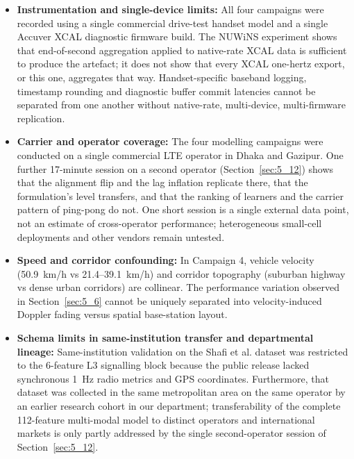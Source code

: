\begin{itemize}
    \item \textbf{Instrumentation and single-device limits:} All four campaigns were recorded using a single commercial drive-test handset model and a single Accuver XCAL diagnostic firmware build. The NUWiNS experiment shows that end-of-second aggregation applied to native-rate XCAL data is sufficient to produce the artefact; it does not show that every XCAL one-hertz export, or this one, aggregates that way. Handset-specific baseband logging, timestamp rounding and diagnostic buffer commit latencies cannot be separated from one another without native-rate, multi-device, multi-firmware replication.
    \item \textbf{Carrier and operator coverage:} The four modelling campaigns were conducted on a single commercial LTE operator in Dhaka and Gazipur. One further 17-minute session on a second operator (Section~\ref{sec:5_12}) shows that the alignment flip and the lag inflation replicate there, that the formulation's level transfers, and that the ranking of learners and the carrier pattern of ping-pong do not. One short session is a single external data point, not an estimate of cross-operator performance; heterogeneous small-cell deployments and other vendors remain untested.
    \item \textbf{Speed and corridor confounding:} In Campaign 4, vehicle velocity (50.9~km/h vs 21.4--39.1~km/h) and corridor topography (suburban highway vs dense urban corridors) are collinear. The performance variation observed in Section~\ref{sec:5_6} cannot be uniquely separated into velocity-induced Doppler fading versus spatial base-station layout.
    \item \textbf{Schema limits in same-institution transfer and departmental lineage:} Same-institution validation on the Shafi et al. \cite{ref38} dataset was restricted to the 6-feature L3 signalling block because the public release lacked synchronous 1~Hz radio metrics and GPS coordinates. Furthermore, that dataset was collected in the same metropolitan area on the same operator by an earlier research cohort in our department; transferability of the complete 112-feature multi-modal model to distinct operators and international markets is only partly addressed by the single second-operator session of Section~\ref{sec:5_12}.
\end{itemize}

